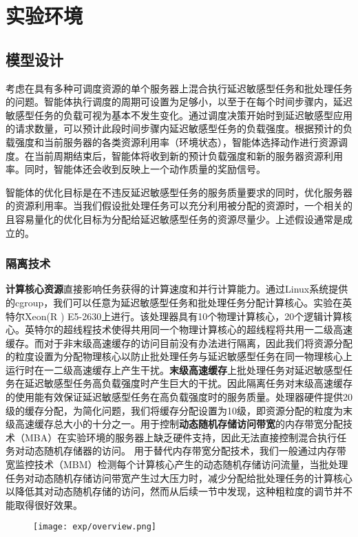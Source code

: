 \chapter{实验环境}
\section{模型设计}
考虑在具有多种可调度资源的单个服务器上混合执行延迟敏感型任务和批处理任务的问题。智能体执行调度的周期可设置为足够小，以至于在每个时间步骤内，延迟敏感型任务的负载可视为基本不发生变化。通过调度决策开始时到延迟敏感型应用的请求数量，可以预计此段时间步骤内延迟敏感型任务的负载强度。根据预计的负载强度和当前服务器的各类资源利用率（环境状态），智能体选择动作进行资源调度。在当前周期结束后，智能体将收到新的预计负载强度和新的服务器资源利用率。同时，智能体还会收到反映上一个动作质量的奖励信号。

智能体的优化目标是在不违反延迟敏感型任务的服务质量要求的同时，优化服务器的资源利用率。当我们假设批处理任务可以充分利用被分配的资源时，一个相关的且容易量化的优化目标为分配给延迟敏感型任务的资源尽量少。上述假设通常是成立的。

\subsection{隔离技术}
\textbf{计算核心资源}直接影响任务获得的计算速度和并行计算能力。通过Linux系统提供的cgroup，我们可以任意为延迟敏感型任务和批处理任务分配计算核心。实验在英特尔Xeon(R
) E5-2630上进行。该处理器具有10个物理计算核心，20个逻辑计算核心。英特尔的超线程技术使得共用同一个物理计算核心的超线程将共用一二级高速缓存。而对于非末级高速缓存的访问目前没有办法进行隔离，因此我们将资源分配的粒度设置为分配物理核心以防止批处理任务与延迟敏感型任务在同一物理核心上运行时在一二级高速缓存上产生干扰。\textbf{末级高速缓存}上批处理任务对延迟敏感型任务在延迟敏感型任务高负载强度时产生巨大的干扰。因此隔离任务对末级高速缓存的使用能有效保证延迟敏感型任务在高负载强度时的服务质量。处理器硬件提供20级的缓存分配，为简化问题，我们将缓存分配设置为10级，即资源分配的粒度为末级高速缓存总大小的十分之一。用于控制\textbf{动态随机存储访问带宽}的内存带宽分配技术（MBA）在实验环境的服务器上缺乏硬件支持，因此无法直接控制混合执行任务对动态随机存储器的访问。
用于替代内存带宽分配技术，我们一般通过内存带宽监控技术（MBM）检测每个计算核心产生的动态随机存储访问流量，当批处理任务对动态随机存储访问带宽产生过大压力时，减少分配给批处理任务的计算核心以降低其对动态随机存储的访问，然而从后续一节中发现，这种粗粒度的调节并不能取得很好效果。

\begin{figure}
  \centering
    \centering
    \texttt{[image: exp/overview.png]}
    \label{fig:overview}    
\end{figure}

